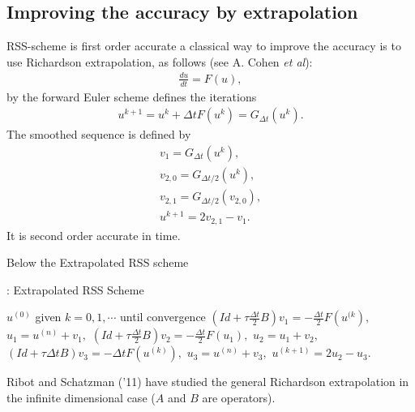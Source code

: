 \documentclass[hyperref={pdfpagemode=FullScreen},9pt]{beamer}
\newcommand{\Frac}[2] {\frac{\textstyle #1} {\textstyle #2}}
\begin{document}
\subsection{Improving the accuracy by extrapolation}
\begin{frame}
RSS-scheme is first order accurate a classical way to improve the accuracy is to use Richardson extrapolation, as follows (see A. Cohen {\it et al}):
\begin{eqnarray*}
\Frac{d u }{dt}=F(u),
\end{eqnarray*}
by the forward Euler scheme defines the iterations
\begin{eqnarray*}
u^{k+1}=u^{k}+\Delta t F(u^k)=G_{\Delta t}(u^k).
\end{eqnarray*}
The smoothed sequence is defined by
\begin{eqnarray*}
v_1=G_{\Delta t}(u^k),\\
v_{2,0}=G_{\Delta t /2}(u^k),\\
v_{2,1}=G_{\Delta t /2}(v_{2,0}),\\
u^{k+1}=2v_{2,1}-v_1.
\end{eqnarray*}
It is second order accurate in time. 
\end{frame}
%
 \begin{frame}
 Below the Extrapolated RSS scheme\\
 \begin{center}
\begin{minipage}[H]{12cm}
  \begin{algorithm}[H]
    \caption{: Extrapolated RSS Scheme}\label{ExtraRSS}
    \begin{algorithmic}[1]
        \State $u^{(0)}$ given
            \For $k=0,1, \cdots$ until convergence
              $ (Id+\tau \frac{\Delta t}{2}B) v_1=-\frac{\Delta t}{2} F(u^{(k}),$
               $u_1=u^{(n)} +v_1,$
                $ (Id+\tau \frac{\Delta t}{2}B) v_2=-\frac{\Delta t}{2} F(u_1),$
                $u_2=u_1+v_2,$
                $(Id+\tau \Delta tB) v_3=-\Delta t  F(u^{(k)}),$
                $u_3=u^{(n)}+v_3,$
                 $u^{(k+1)}=2u_2-u_3.$              
            \EndFor
    \end{algorithmic}
    \end{algorithm}
\end{minipage}
\end{center}
Ribot and Schatzman ('11) have studied the general Richardson extrapolation in the infinite dimensional case ($A$ and $B$ are operators).
 \end{frame}
\end{document}
